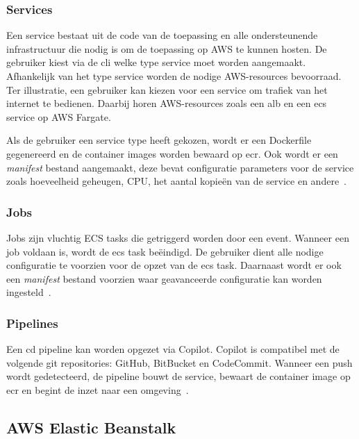\subsubsection{Services}

Een service bestaat uit de code van de toepassing en alle ondersteunende infrastructuur die nodig is om de toepassing op AWS te kunnen hosten.
De gebruiker kiest via de \acrshort{cli} welke type service moet worden aangemaakt.
Afhankelijk van het type service worden de nodige AWS-resources bevoorraad.
Ter illustratie, een gebruiker kan kiezen voor een service om trafiek van het internet te bedienen.
Daarbij horen AWS-resources zoals een \acrfull{alb} en een \acrshort{ecs} service op AWS Fargate.

Als de gebruiker een service type heeft gekozen, wordt er een Dockerfile gegenereerd en de container images worden bewaard op \acrfull{ecr}.
Ook wordt er een \emph{manifest} bestand aangemaakt, deze bevat configuratie parameters voor de service zoals hoeveelheid geheugen, CPU, het aantal kopieën van de service en andere~\autocite{Karakus2022}.

\subsubsection{Jobs}

Jobs zijn vluchtig ECS tasks die getriggerd worden door een event.
Wanneer een job voldaan is, wordt de \acrshort{ecs} task beëindigd.
De gebruiker dient alle nodige configuratie te voorzien voor de opzet van de \acrshort{ecs} task.
Daarnaast wordt er ook een \emph{manifest} bestand voorzien waar geavanceerde configuratie kan worden ingesteld~\autocite{Karakus2022}.

\subsubsection{Pipelines}

Een \acrfull{cd} pipeline kan worden opgezet via Copilot.
Copilot is compatibel met de volgende git repositories: GitHub, BitBucket en CodeCommit.
Wanneer een push wordt gedetecteerd, de pipeline bouwt de service, bewaart de container image op \acrshort{ecr} en begint de inzet naar een omgeving~\autocite{Karakus2022}.

\subsection{AWS Elastic Beanstalk}
\label{subsec:service-elastic-beanstalk}


